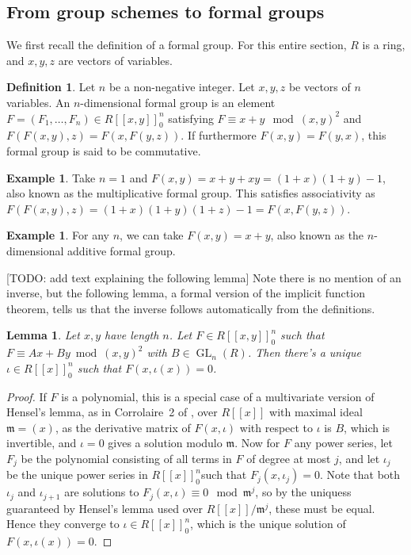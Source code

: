 \documentclass[12pt]{article}
\newcommand{\m}{\mathfrak{m}}
\DeclareMathOperator{\GL}{GL}
\theoremstyle{plain}
\newtheorem{lem}[thm]{Lemma} %
\theoremstyle{definition}
\newtheorem{defn}[thm]{Definition} %
\newtheorem{exmp}[thm]{Example} %
\theoremstyle{remark}
\begin{document}
\subsection{From group schemes to formal groups}
We first recall the definition of a formal group. For this entire section, $R$ is a ring, and $x,y,z$ are vectors of variables.
\begin{defn}
\label{defn:formalgroup}
Let $n$ be a non-negative integer. Let $x,y,z$ be vectors of $n$ variables. An $n$-dimensional formal group is an element $F = (F_1,\dots,F_n) \in R[[x,y]]_0^n$ satisfying $F \equiv x + y \mod (x,y)^2$ and $F(F(x,y),z) = F(x,F(y,z))$. If furthermore $F(x,y) = F(y,x)$, this formal group is said to be commutative.
\end{defn}
\begin{exmp}
\label{exmp:gmformalgroup}
Take $n=1$ and $F(x,y) = x + y + xy = (1+x)(1+y)-1$, also known as the multiplicative formal group. This satisfies associativity as $F(F(x,y),z) = (1+x)(1+y)(1+z)-1 = F(x,F(y,z))$.
\end{exmp}
\begin{exmp}
\label{exmp:ganformalgroup}
For any $n$, we can take $F(x,y) = x+ y$, also known as the $n$-dimensional additive formal group.
\end{exmp}
[TODO: add text explaining the following lemma]
Note there is no mention of an inverse, but the following lemma, a formal version of the implicit function theorem, tells us that the inverse follows automatically from the definitions.
\begin{lem}
\label{lem:implicitfunction}
Let $x,y$ have length $n$. Let $F \in R[[x,y]]_0^n$ such that $F \equiv Ax + By \bmod (x,y)^2$ with $B \in \GL_n(R)$. Then there's a unique $\iota \in R[[x]]_0^n$ such that $F(x,\iota(x)) = 0$. 
\end{lem}
\begin{proof}
If $F$ is a polynomial, this is a special case of a multivariate version of Hensel's lemma, as in Corrolaire~2 of \cite[III,4.5]{BourbakiCA}, over $R[[x]]$ with maximal ideal $\m = (x)$, as the derivative matrix of $F(x,\iota)$ with respect to $\iota$ is $B$, which is invertible, and $\iota = 0$ gives a solution modulo $\m$. Now for $F$ any power series, let $F_j$ be the polynomial consisting of all terms in $F$ of degree at most $j$, and let $\iota_j$ be the unique power series in $R[[x]]_0^n$such that $F_j(x,\iota_j) = 0$. Note that both $\iota_j$ and $\iota_{j+1}$ are solutions to $F_j(x,\iota) \equiv 0 \mod \m^j$, so by the uniquess guaranteed by Hensel's lemma used over $R[[x]]/\m^j$, these must be equal. Hence they converge to $\iota \in R[[x]]_0^n$, which is the unique solution of $F(x,\iota(x)) = 0$.
\end{proof}
\end{document}
